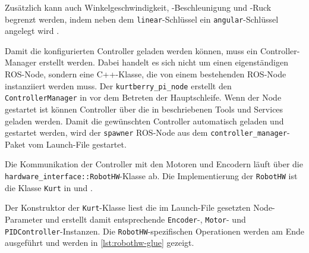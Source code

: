 \documentclass[german]{thesis_KBS}
\newcommand{\code}[1]{\texttt{#1}}  %
\begin{document}
Zusätzlich kann auch Winkelgeschwindigkeit, -Beschleunigung und -Ruck begrenzt
werden, indem neben dem \code{linear}-Schlüssel ein \code{angular}-Schlüssel
angelegt wird \cite{ros-diff-drive-controller}.

Damit die konfigurierten Controller geladen werden können, muss ein
Controller-Manager erstellt werden. Dabei handelt es sich nicht um einen
eigenständigen ROS-Node, sondern eine C++-Klasse, die von einem bestehenden
ROS-Node instanziiert werden muss. Der \code{kurtberry\_pi\_node} erstellt den
\code{ControllerManager} in  vor dem Betreten der
Hauptschleife. Wenn der Node gestartet ist können Controller über die in
\cite{ros-controller-manager} beschriebenen Tools und Services geladen werden.
Damit die gewünschten Controller automatisch geladen und gestartet werden, wird
der \code{spawner} ROS-Node aus dem \code{controller\_manager}-Paket vom
Launch-File gestartet.

Die Kommunikation der Controller mit den Motoren und Encodern läuft über die
\code{hardware\_interface::RobotHW}-Klasse ab. Die Implementierung der
\code{RobotHW} ist die Klasse \code{Kurt} in  und
.

Der Konstruktor der \code{Kurt}-Klasse liest die im Launch-File gesetzten
Node-Parameter und erstellt damit entsprechende \code{Encoder}-, \code{Motor}-
und \code{PIDController}-Instanzen. Die \code{RobotHW}-spezifischen Operationen
werden am Ende ausgeführt und werden in \autoref{lst:robothw-glue} gezeigt.




\end{document}
